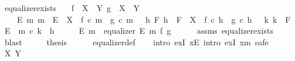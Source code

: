 \begin{isabellebody}
\isanewline
{}\isamarkupfalse%
\ equalizer{\isacharunderscore}{\kern0pt}exists{}{\isacharcolon}{\kern0pt}\isanewline
\ \ \ {\isachardoublequoteopen}f\ {\isacharcolon}{\kern0pt}\ X\ {\isasymrightarrow}\ Y{\isachardoublequoteclose}\ {\isachardoublequoteopen}g\ {\isacharcolon}{\kern0pt}\ X\ {\isasymrightarrow}\ Y{\isachardoublequoteclose}\isanewline
\ \ \ {\isachardoublequoteopen}{\isasymexists}\ E\ m{\isachardot}{\kern0pt}\ m\ {\isacharcolon}{\kern0pt}\ E\ {\isasymrightarrow}\ X\ {\isasymand}\ f\ {\isasymcirc}\isactrlsub c\ m\ {\isacharequal}{\kern0pt}\ g\ {\isasymcirc}\isactrlsub c\ m\ {\isasymand}\ {\isacharparenleft}{\kern0pt}{\isasymforall}\ h\ F{\isachardot}{\kern0pt}\ {\isacharparenleft}{\kern0pt}{\isacharparenleft}{\kern0pt}h\ {\isacharcolon}{\kern0pt}\ F\ {\isasymrightarrow}\ X{\isacharparenright}{\kern0pt}\ {\isasymand}\ {\isacharparenleft}{\kern0pt}f\ {\isasymcirc}\isactrlsub c\ h\ {\isacharequal}{\kern0pt}\ g\ {\isasymcirc}\isactrlsub c\ h{\isacharparenright}{\kern0pt}{\isacharparenright}{\kern0pt}\ {\isasymlongrightarrow}\ {\isacharparenleft}{\kern0pt}{\isasymexists}{\isacharbang}{\kern0pt}\ k{\isachardot}{\kern0pt}\ {\isacharparenleft}{\kern0pt}k\ {\isacharcolon}{\kern0pt}\ F\ {\isasymrightarrow}\ E{\isacharparenright}{\kern0pt}\ {\isasymand}\ m\ {\isasymcirc}\isactrlsub c\ k\ {\isacharequal}{\kern0pt}\ h{\isacharparenright}{\kern0pt}{\isacharparenright}{\kern0pt}{\isachardoublequoteclose}\isanewline
%
\isadelimproof
%
\endisadelimproof
%
\isatagproof
{}\isamarkupfalse%
\ {\isacharminus}{\kern0pt}\isanewline
\ \ \isamarkupfalse%
\ E\ m\ \ {\isachardoublequoteopen}equalizer\ E\ m\ f\ g{\isachardoublequoteclose}\isanewline
\ \ \ \ \isamarkupfalse%
\ assms\ equalizer{\isacharunderscore}{\kern0pt}exists\ \isamarkupfalse%
\ blast\isanewline
\ \ \isamarkupfalse%
\ \isamarkupfalse%
\ {\isacharquery}{\kern0pt}thesis\isanewline
\ \ \ \ \isamarkupfalse%
\ equalizer{\isacharunderscore}{\kern0pt}def\isanewline
\ \ \isamarkupfalse%
\ {\isacharparenleft}{\kern0pt}intro\ exI{\isacharbrackleft}{\kern0pt}\ x{\isacharequal}{\kern0pt}E{\isacharbrackright}{\kern0pt}{\isacharcomma}{\kern0pt}\ intro\ exI{\isacharbrackleft}{\kern0pt}\ x{\isacharequal}{\kern0pt}m{\isacharbrackright}{\kern0pt}{\isacharcomma}{\kern0pt}\ safe{\isacharparenright}{\kern0pt}\isanewline
\ \ \ \ \isamarkupfalse%
\ X{\isacharprime}{\kern0pt}\ Y{\isacharprime}{\kern0pt}\isanewline

\end{isabellebody}
